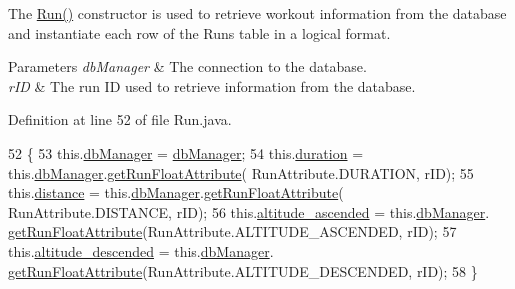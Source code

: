 The \mbox{\hyperlink{classcom_1_1activitytracker_1_1_run_a5568c1c514835056d2abc22cfba222c5}{Run()}} constructor is used to retrieve workout information from the database and instantiate each row of the Runs table in a logical format.


\begin{DoxyParams}{Parameters}
{\em db\+Manager} & The connection to the database. \\
\hline
{\em r\+ID} & The run ID used to retrieve information from the database. \\
\hline
\end{DoxyParams}


Definition at line 52 of file Run.\+java.


\begin{DoxyCode}
52                                                    \{
53         this.\mbox{\hyperlink{classcom_1_1activitytracker_1_1_run_ab90e32eda9f4c671ae3575f971edca6b}{dbManager}} = \mbox{\hyperlink{classcom_1_1activitytracker_1_1_run_ab90e32eda9f4c671ae3575f971edca6b}{dbManager}};
54         this.\mbox{\hyperlink{classcom_1_1activitytracker_1_1_run_a5e38d293d29d4b65c9290ff4bee82e03}{duration}} = this.\mbox{\hyperlink{classcom_1_1activitytracker_1_1_run_ab90e32eda9f4c671ae3575f971edca6b}{dbManager}}.\mbox{\hyperlink{classcom_1_1activitytracker_1_1_d_b_manager_a666452f1e5862f90c06b0beb9a9fcfdd}{getRunFloatAttribute}}(
      RunAttribute.DURATION, rID);
55         this.\mbox{\hyperlink{classcom_1_1activitytracker_1_1_run_a7b4ca8c4ecea4da1653f03b8c8fc16a8}{distance}} = this.\mbox{\hyperlink{classcom_1_1activitytracker_1_1_run_ab90e32eda9f4c671ae3575f971edca6b}{dbManager}}.\mbox{\hyperlink{classcom_1_1activitytracker_1_1_d_b_manager_a666452f1e5862f90c06b0beb9a9fcfdd}{getRunFloatAttribute}}(
      RunAttribute.DISTANCE, rID);
56         this.\mbox{\hyperlink{classcom_1_1activitytracker_1_1_run_a247fe29ef5dceeb25750fc7c2701f5c8}{altitude\_ascended}} = this.\mbox{\hyperlink{classcom_1_1activitytracker_1_1_run_ab90e32eda9f4c671ae3575f971edca6b}{dbManager}}.
      \mbox{\hyperlink{classcom_1_1activitytracker_1_1_d_b_manager_a666452f1e5862f90c06b0beb9a9fcfdd}{getRunFloatAttribute}}(RunAttribute.ALTITUDE\_ASCENDED, rID);
57         this.\mbox{\hyperlink{classcom_1_1activitytracker_1_1_run_a26cd078680ee374482ce848b90308dda}{altitude\_descended}} = this.\mbox{\hyperlink{classcom_1_1activitytracker_1_1_run_ab90e32eda9f4c671ae3575f971edca6b}{dbManager}}.
      \mbox{\hyperlink{classcom_1_1activitytracker_1_1_d_b_manager_a666452f1e5862f90c06b0beb9a9fcfdd}{getRunFloatAttribute}}(RunAttribute.ALTITUDE\_DESCENDED, rID);
58     \}
\end{DoxyCode}


